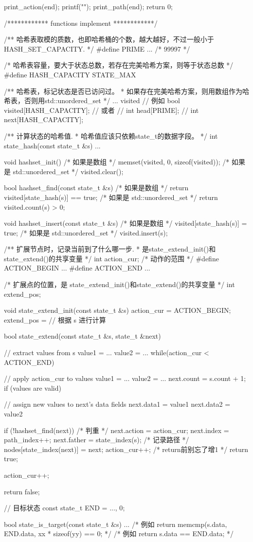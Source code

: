 \begin{Codex}[label=bfs_template2.cpp]
{    print_action(end);
    printf("\n");
    print_path(end);
    return 0;
}

/************ functions implement ************/

/** 哈希表取模的质数，也即哈希桶的个数，越大越好，不过一般小于 HASH_SET_CAPACITY. */
#define PRIME ...  /* 99997 */

/* 哈希表容量，要大于状态总数，若存在完美哈希方案，则等于状态总数 */
#define HASH_CAPACITY STATE_MAX

/** 哈希表，标记状态是否已访问过。
 * 如果存在完美哈希方案，则用数组作为哈希表，否则用std::unordered_set
 */
... visited
// 例如 bool visited[HASH_CAPACITY];
// 或者
// int head[PRIME];
// int next[HASH_CAPACITY];

/** 计算状态的哈希值.
 * 哈希值应该只依赖state_t的数据字段。
 */
int state_hash(const state_t &s) {
    ...
}

void hashset_init() {
    /* 如果是数组 */
    memset(visited, 0, sizeof(visited));
    /* 如果是 std::unordered_set */
    visited.clear();
}

bool hashset_find(const state_t &s) {
    /* 如果是数组 */
    return visited[state_hash(s)] == true;
    /* 如果是 std::unordered_set */
    return visited.count(s) > 0;
}

void hashset_insert(const state_t &s) {
    /* 如果是数组 */
    visited[state_hash(s)] = true;
    /* 如果是 std::unordered_set */
    visited.insert(s);
}

/** 扩展节点时，记录当前到了什么哪一步.
 * 是state_extend_init()和state_extend()的共享变量
 */
int action_cur;
/* 动作的范围 */
#define ACTION_BEGIN ...
#define ACTION_END ...

/* 扩展点的位置，是 state_extend_init()和state_extend()的共享变量 */
int extend_pos;

void state_extend_init(const state_t &s) {
    action_cur = ACTION_BEGIN;
    extend_pos = // 根据 s 进行计算
}

bool state_extend(const state_t &s, state_t &next) {
    // extract values from s
    value1 = ...
    value2 = ...
    while(action_cur < ACTION_END) {
        // apply action_cur to values
        value1 = ...
        value2 = ...
        next.count = s.count + 1;
        if (values are valid) {
            // assign new values to next's data fields
            next.data1 = value1
            next.data2 = value2

            if (!hashset_find(next)) { /* 判重 */
                next.action = action_cur;
                next.index = path_index++;
                next.father = state_index(s);
                /* 记录路径 */
                nodes[state_index(next)] = next;
                action_cur++;  /* return前别忘了增1 */
                return true;
            }
        }
        action_cur++;
    }
    return false;
}

// 目标状态
const state_t END = {..., 0};

bool state_is_target(const state_t &s) {
    ...
    /* 例如 return memcmp(s.data, END.data, xx * sizeof(yy) == 0; */
    /* 例如 return s.data == END.data; */
}
\end{Codex}

